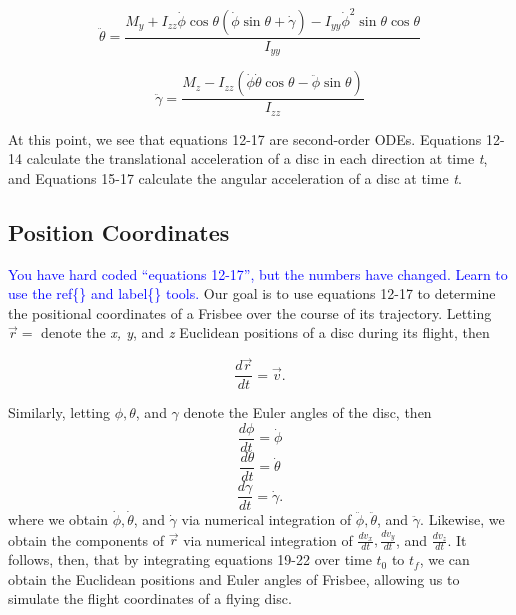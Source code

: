 \documentclass[a4paper,12pt, oneside]{article}
\newcommand{\blue}[1]{\textcolor{blue}{#1}}
\begin{document}
\begin{equation}
\ddot\theta=\frac{M_y+I_{zz}\dot\phi\cos\theta(\dot\phi\sin\theta+\dot\gamma)-I_{yy}\dot\phi^2\sin\theta\cos\theta} {I_{yy}}
\end{equation}

\begin{equation}
\ddot\gamma=\frac{M_z-I_{zz}(\dot\phi\dot\theta\cos\theta-\ddot\phi\sin\theta)}{I_{zz}}
\end{equation}

At this point, we see that equations 12-17 are second-order ODEs. Equations 12-14 calculate the translational acceleration of a disc in each direction at time \textit{t}, and Equations 15-17 calculate the angular acceleration of a disc at time \textit{t}.

\subsection{Position Coordinates}
\color{BurntOrange}
\blue{You have hard coded ``equations 12-17'', but the numbers have changed. Learn to use the ref\{\} and label\{\} tools.}
Our goal is to use equations 12-17 to determine the positional coordinates of a Frisbee over the course of its trajectory. Letting $\vec{r}=$ denote the \textit{x, y}, and \textit{z} Euclidean positions of a disc during its flight, then 

\begin{equation}
  \label{eq:position_deriv}
  \frac{d\vec{r}}{dt} = \vec{v}.
\end{equation}

Similarly, letting $\phi, \theta$, and $\gamma$ denote the Euler angles of the disc, then
\begin{equation}
\frac{d\phi}{dt}=\dot\phi
\end{equation}
\begin{equation}
\frac{d\theta}{dt}=\dot\theta
\end{equation}
\begin{equation}
\frac{d\gamma}{dt}=\dot\gamma.
\end{equation}
where we obtain $\dot\phi, \dot\theta$, and $\dot\gamma$ via numerical integration of $\ddot\phi, \ddot\theta$, and $\ddot\gamma$. Likewise, we obtain the components of $\vec{r}$ via numerical integration of $\frac{{dv}_x}{dt}, \frac{{dv}_y}{dt}$, and $\frac{{dv}_z}{dt}$. It follows, then, that by integrating equations 19-22 over time $t_0$ to $t_f$, we can obtain the Euclidean positions and Euler angles of Frisbee, allowing us to simulate the flight coordinates of a flying disc. 
\end{document}
